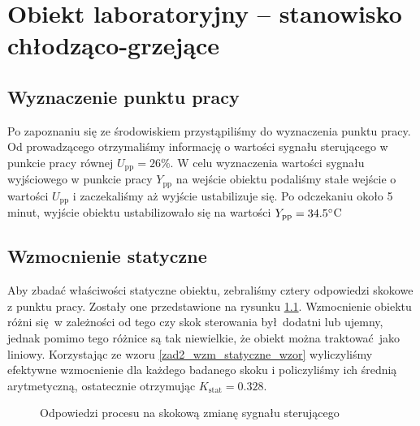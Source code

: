 \chapter{Obiekt laboratoryjny -- stanowisko chłodząco-grzejące}
\label{lab1}

\section{Wyznaczenie punktu pracy}
\label{lab1_punkt_pracy}

Po zapoznaniu się ze środowiskiem przystąpiliśmy do wyznaczenia punktu pracy.
Od prowadzącego otrzymaliśmy informację o wartości sygnału sterującego w punkcie pracy 
równej $U_{\mathrm{pp}} = 26\%$. W celu wyznaczenia wartości sygnału wyjściowego w 
punkcie pracy $Y_{\mathrm{pp}}$ na wejście obiektu podaliśmy stałe wejście o wartości 
$U_{\mathrm{pp}}$ i zaczekaliśmy aż wyjście ustabilizuje się. Po odczekaniu około 5 minut,
wyjście obiektu ustabilizowało się na wartości $Y_{\mathrm{pp}} = \num{34,5} \degree $C


\section{Wzmocnienie statyczne}
\label{lab1_odpowiedzi}
Aby zbadać właściwości statyczne obiektu, zebraliśmy cztery odpowiedzi skokowe z punktu pracy.
Zostały one przedstawione na rysunku \ref{lab1_odpowiedzi_rys}. Wzmocnienie obiektu różni się w 
zależności od tego czy skok sterowania był dodatni lub ujemny, jednak pomimo tego różnice są 
tak niewielkie, że obiekt można traktować jako liniowy. Korzystając ze wzoru \ref{zad2_wzm_statyczne_wzor}
wyliczyliśmy efektywne wzmocnienie dla każdego badanego skoku i policzyliśmy ich średnią arytmetyczną, 
ostatecznie otrzymując $K_{\mathrm{stat}} = \num{0.328}$.

\begin{figure}[b]
    \centering
    \caption{Odpowiedzi procesu na skokową zmianę sygnału sterującego}
    \label{lab1_odpowiedzi_rys}
\end{figure}
